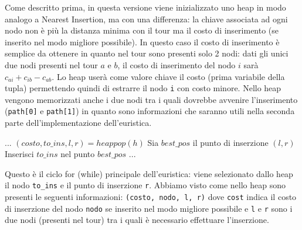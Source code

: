 \documentclass[a4paper,12pt]{report}
\begin{document}
Come descritto prima, in questa versione viene inizializzato uno heap in modo analogo a Nearest Insertion, ma con una differenza: la chiave associata ad ogni nodo non è più la distanza minima con il tour ma il costo di inserimento (se inserito nel modo migliore possibile). In questo caso il costo di inserimento è semplice da ottenere in quanto nel tour sono presenti solo 2 nodi: dati gli unici due nodi presenti nel tour $a$ e $b$, il costo di inserimento del nodo $i$ sarà $c_{ai} + c_{ib} - c_{ab}$. Lo heap userà come valore chiave il costo (prima variabile della tupla) permettendo quindi di estrarre il nodo \lstinline!i! con costo minore. Nello heap vengono memorizzati anche i due nodi tra i quali dovrebbe avvenire l'inserimento (\lstinline!path[0]! e \lstinline!path[1]!) in quanto sono informazioni che saranno utili nella seconda parte dell'implementazione dell'euristica.
\begin{tcolorbox}[colframe=black, colback=white, boxrule=0.5pt, title=Cheapest Insertion Versione 2, coltitle=black, fonttitle=\bfseries, colbacktitle=white, breakable]
  \begin{algorithmic}[1]
    \State ...
      \State $(costo, to\_ins, l, r) = heappop(h)$
      \State Sia $best\_pos$ il punto di inserzione $(l, r)$
      \State Inserisci $to\_ins$ nel punto $best\_pos$
      \State ...
    \EndWhile
  \end{algorithmic}
\end{tcolorbox}
Questo è il ciclo for (while) principale dell'euristica: viene selezionato dallo heap il nodo \lstinline!to_ins! e il punto di inserzione \lstinline!r!. Abbiamo visto come nello heap sono presenti le seguenti informazioni: \lstinline!(costo, nodo, l, r)! dove \lstinline!cost! indica il costo di inserzione del nodo \lstinline!nodo! se inserito nel modo migliore possibile e \lstinline!l! e \lstinline!r! sono i due nodi (presenti nel tour) tra i quali è necessario effettuare l'inserzione.
\end{document}
